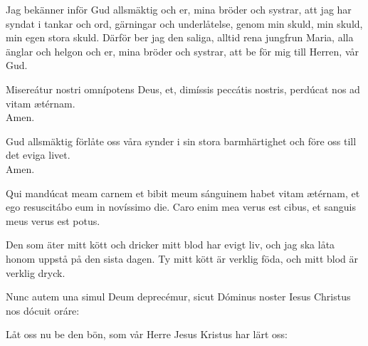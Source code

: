 {Jag bekänner inför Gud alls\-mäk\-tig och er, mina brö\-der och sys\-trar, att jag har syndat i tankar och ord, gär\-nin\-gar och underlåtelse, genom min skuld, min skuld, min egen stora skuld. Därför ber jag den saliga, alltid rena jungfrun Maria, alla änglar och helgon och er, mina bröder och sys\-trar, att be för mig till Herren, vår Gud.\par}


\smallskip
{}

\begin{multicols}{2}
\renewcommand{\columnseprulecolor}{\color{rubrica}}
\renewcommand{\columnseprule}{0.4pt}

\va Misereátur nostri omnípotens Deus, et, dimíssis peccátis nostris, perdúcat
nos ad vitam ætérnam.\\
\ra Amen.
\columnbreak

\va Gud allsmäktig förlåte oss våra synder i sin stora barmhärtighet och före oss till det eviga livet.\\
\ra Amen.
\end{multicols}

\smallskip
{}
\smallskip

\begin{multicols}{2}
\renewcommand{\columnseprulecolor}{\color{rubrica}}
\renewcommand{\columnseprule}{0.4pt}
Qui mandúcat meam carnem et bibit meum sánguinem habet vitam
ætérnam, et ego resuscitábo eum in novíssimo die. Caro enim mea
verus est cibus, et sanguis meus verus est potus.
\columnbreak

Den som äter mitt kött och dricker mitt blod har evigt liv, och jag ska låta honom uppstå på den sista dagen. Ty mitt kött är verklig föda, och mitt blod är verklig dryck.
\end{multicols}

\smallskip
{}

\begin{multicols}{2}
\renewcommand{\columnseprulecolor}{\color{rubrica}}
\renewcommand{\columnseprule}{0.4pt}
\va Nunc autem una simul Deum deprecémur, sicut Dóminus noster
Iesus Christus nos dócuit oráre:
\columnbreak

\va Låt oss nu be den bön, som vår Herre Jesus Kristus har lärt oss:
\end{multicols}

